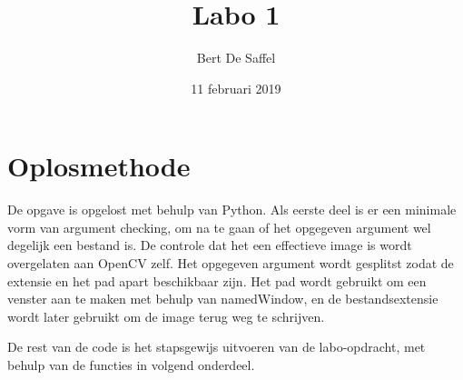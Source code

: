\documentclass{article}
\begin{document}
	\title{Labo 1}
	\author{Bert De Saffel}
	\date{11 februari 2019}
	\maketitle
	
	\section{Oplosmethode}
	De opgave is opgelost met behulp van Python. Als eerste deel is er een minimale vorm van argument checking, om na te gaan of het opgegeven argument wel degelijk een bestand is. De controle dat het een effectieve image is wordt overgelaten aan OpenCV zelf. Het opgegeven argument wordt gesplitst zodat de extensie en het pad apart beschikbaar zijn. Het pad wordt gebruikt om een venster aan te maken met behulp van namedWindow, en de bestandsextensie wordt later gebruikt om de image terug weg te schrijven. 
	
	De rest van de code is het stapsgewijs uitvoeren van de labo-opdracht, met behulp van de functies in volgend onderdeel.
\end{document}
